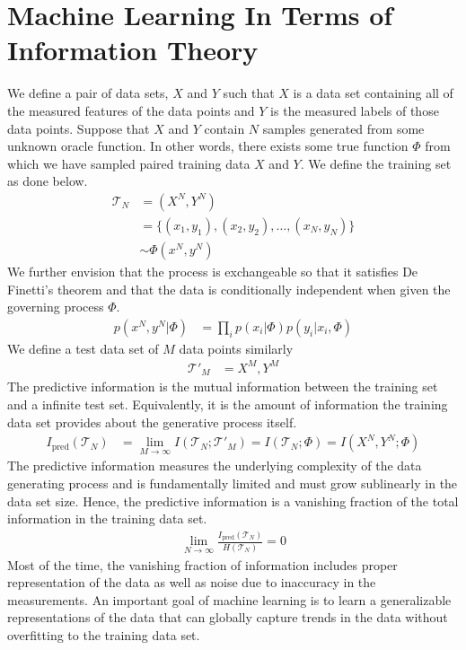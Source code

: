 \documentclass[book.tex]{subfiles}
\begin{document}
\section{Machine Learning In Terms of Information Theory}
We define a pair of data sets, $X$ and $Y$ such that $X$ is a data set containing all of the measured features of the data points and $Y$ is the measured labels of those data points. Suppose that $X$ and $Y$ contain $N$ samples generated from some unknown oracle function. In other words, there exists some true function $\Phi$ from which we have sampled paired training data $X$ and $Y$. We define the training set as done below.
\begin{align}
\mathcal{T}_N &= (X^N,Y^N)\\
&= \{(x_1,y_1),(x_2,y_2),\dotsc,(x_N,y_N)\} \\
&\sim\Phi(x^N,y^N)
\end{align}
We further envision that the process is exchangeable so that it satisfies De Finetti's theorem and that the data is conditionally independent when given the governing process $\Phi$.
\begin{align}
p(x^N,y^N|\Phi)&=\prod_{i}p(x_i|\Phi)p(y_i|x_i,\Phi)
\end{align}
We define a test data set of $M$ data points similarly
\begin{align}
\mathcal{T}'_M & ={X^M,Y^M}
\end{align}
The predictive information is the mutual information between the training set and a infinite test set. Equivalently, it is the amount of information the training data set provides about the generative process itself.
\begin{align}
I_{\textrm{pred}}(\mathcal{T}_N) &= \lim_{M\to\infty}  I(\mathcal{T}_N;\mathcal{T}'_M) =I(\mathcal{T}_N;\Phi)=I(X^N,Y^N;\Phi)
\end{align}
The predictive information measures the underlying complexity of the data generating process and is fundamentally limited and must grow sublinearly in the data set size. Hence, the predictive information is a vanishing fraction of the total information in the training data set.
\begin{align}
\lim_{N\to\infty}\frac{I_{\textrm{pred}}(\mathcal{T}_N)}{H(\mathcal{T}_N)}=0
\end{align}
Most of the time, the vanishing fraction of information includes proper representation of the data as well as noise due to inaccuracy in the measurements. An important goal of machine learning is to learn a generalizable representations of the data that can globally capture trends in the data without overfitting to the training data set.
\end{document}
